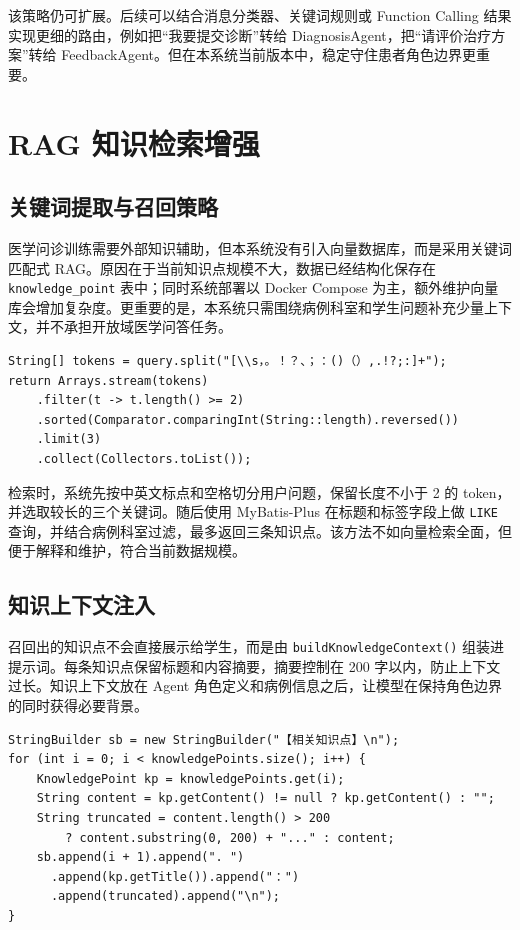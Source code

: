 该策略仍可扩展。后续可以结合消息分类器、关键词规则或 Function Calling 结果实现更细的路由，例如把“我要提交诊断”转给 DiagnosisAgent，把“请评价治疗方案”转给 FeedbackAgent。但在本系统当前版本中，稳定守住患者角色边界更重要。

\section{RAG 知识检索增强}

\subsection{关键词提取与召回策略}

医学问诊训练需要外部知识辅助，但本系统没有引入向量数据库，而是采用关键词匹配式 RAG。原因在于当前知识点规模不大，数据已经结构化保存在 \texttt{knowledge\_point} 表中；同时系统部署以 Docker Compose 为主，额外维护向量库会增加复杂度。更重要的是，本系统只需围绕病例科室和学生问题补充少量上下文，并不承担开放域医学问答任务。

\begin{lstlisting}[style=java, caption={KnowledgeRAGService 关键词提取（节选）}, label={lst:rag_extract}]
String[] tokens = query.split("[\\s，。！？、；：()（）,.!?;:]+");
return Arrays.stream(tokens)
    .filter(t -> t.length() >= 2)
    .sorted(Comparator.comparingInt(String::length).reversed())
    .limit(3)
    .collect(Collectors.toList());
\end{lstlisting}

检索时，系统先按中英文标点和空格切分用户问题，保留长度不小于 2 的 token，并选取较长的三个关键词。随后使用 MyBatis-Plus 在标题和标签字段上做 \texttt{LIKE} 查询，并结合病例科室过滤，最多返回三条知识点。该方法不如向量检索全面，但便于解释和维护，符合当前数据规模。

\subsection{知识上下文注入}

召回出的知识点不会直接展示给学生，而是由 \texttt{buildKnowledgeContext()} 组装进提示词。每条知识点保留标题和内容摘要，摘要控制在 200 字以内，防止上下文过长。知识上下文放在 Agent 角色定义和病例信息之后，让模型在保持角色边界的同时获得必要背景。

\begin{lstlisting}[style=java, caption={RAG 知识上下文构造（节选）}, label={lst:rag_context}]
StringBuilder sb = new StringBuilder("【相关知识点】\n");
for (int i = 0; i < knowledgePoints.size(); i++) {
    KnowledgePoint kp = knowledgePoints.get(i);
    String content = kp.getContent() != null ? kp.getContent() : "";
    String truncated = content.length() > 200
        ? content.substring(0, 200) + "..." : content;
    sb.append(i + 1).append(". ")
      .append(kp.getTitle()).append("：")
      .append(truncated).append("\n");
}
\end{lstlisting}

